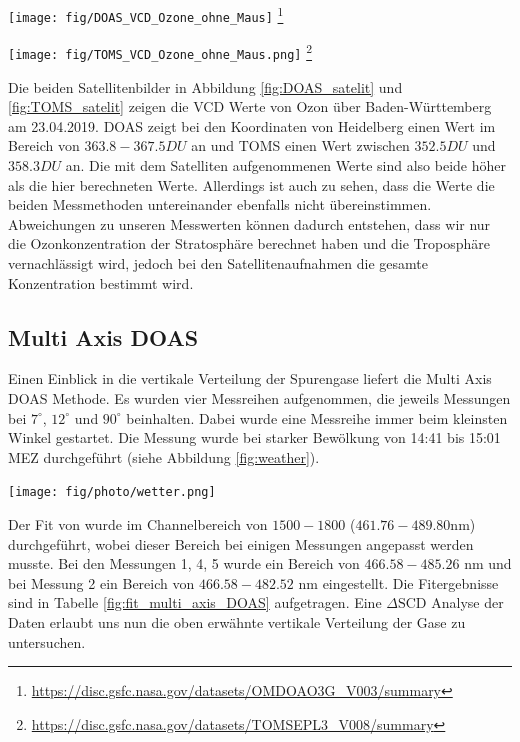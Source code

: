 \documentclass[12pt, a4paper, bibliography=totoc]{scrartcl}
\begin{document}
\begin{multicols}{2}
\begin{center}
	\texttt{[image: fig/DOAS\_VCD\_Ozone\_ohne\_Maus]}
    \footnote{\url{https://disc.gsfc.nasa.gov/datasets/OMDOAO3G_V003/summary}}
	\label{fig:DOAS_satelit}
\end{center} 

\begin{center}
	\texttt{[image: fig/TOMS\_VCD\_Ozone\_ohne\_Maus.png]}
    \footnote{\url{https://disc.gsfc.nasa.gov/datasets/TOMSEPL3_V008/summary}}
	\label{fig:TOMS_satelit}
\end{center} 
Die beiden Satellitenbilder in Abbildung \ref{fig:DOAS_satelit} und \ref{fig:TOMS_satelit} zeigen die VCD Werte von Ozon über Baden-Württemberg am 23.04.2019.
DOAS zeigt bei den Koordinaten von Heidelberg einen Wert im Bereich von $363.8 - 367.5 \si{DU}$ an und TOMS einen Wert zwischen $352.5 \si{DU}$ und $358.3 \si{DU}$ an.
Die mit dem Satelliten aufgenommenen Werte sind also beide höher als die hier berechneten Werte.
Allerdings ist auch zu sehen, dass die Werte die beiden Messmethoden untereinander ebenfalls nicht übereinstimmen.
Abweichungen zu unseren Messwerten können dadurch entstehen, dass wir nur die Ozonkonzentration der Stratosphäre berechnet haben und die Troposphäre vernachlässigt wird, jedoch bei den Satellitenaufnahmen die gesamte Konzentration bestimmt wird.


\subsection{Multi Axis DOAS}\label{ssec:multi_axis_DOAS}

Einen Einblick in die vertikale Verteilung der Spurengase liefert die Multi Axis DOAS Methode.
Es wurden vier Messreihen aufgenommen, die jeweils Messungen bei $7^\circ$, $12^\circ$ und $90^\circ$ beinhalten. 
Dabei wurde eine Messreihe immer beim kleinsten Winkel gestartet.
Die Messung wurde bei starker Bewölkung von 14:41 bis 15:01 MEZ durchgeführt (siehe Abbildung \ref{fig:weather}).

\begin{center}
	\texttt{[image: fig/photo/wetter.png]}
	\label{fig:weather}
\end{center} 

Der Fit von  wurde im Channelbereich von $1500-1800$ ($461.76 - 489.80$\si{nm}) durchgeführt, wobei dieser Bereich bei einigen Messungen angepasst werden musste. 
Bei den Messungen 1, 4, 5 wurde ein Bereich von $466.58 - 485.26$ \si{nm} und bei Messung 2 ein Bereich von $466.58 - 482.52$ \si{nm} eingestellt.
Die Fitergebnisse sind in Tabelle \ref{fig:fit_multi_axis_DOAS} aufgetragen.
Eine $\Delta \text{SCD}$ Analyse der Daten erlaubt uns nun die oben erwähnte vertikale Verteilung der Gase zu untersuchen.


\end{multicols}
\end{document}
